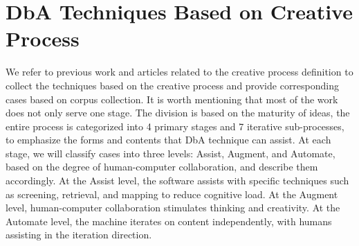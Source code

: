 \section{DbA Techniques Based on Creative Process}
We refer to previous work and articles related to the creative process definition\cite{frich2019mapping, chung2021intersection, hsueh2024counts, cross2021engineering, keates2002user, weaver2010transformation} to collect the techniques based on the creative process and provide corresponding cases based on corpus collection. It is worth mentioning that most of the work does not only serve one stage. The division is based on the maturity of ideas, the entire process is categorized into 4 primary stages and 7 iterative sub-processes, to emphasize the forms and contents that DbA technique can assist. At each stage, we will classify cases into three levels: Assist, Augment, and Automate, based on the degree of human-computer collaboration, and describe them accordingly. At the Assist level, the software assists with specific techniques such as screening, retrieval, and mapping to reduce cognitive load. At the Augment level, human-computer collaboration stimulates thinking and creativity. At the Automate level, the machine iterates on content independently, with humans assisting in the iteration direction.


